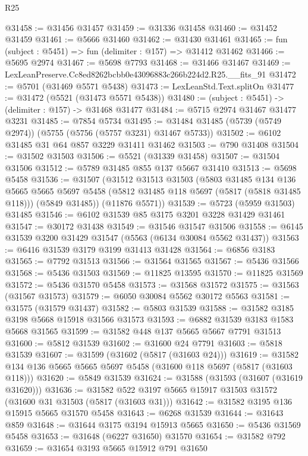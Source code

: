 \begin{lexlean}{R25}
\begin{coremodule}
@31458 := @31456 @31457
@31459 := @31336 @31458
@31460 := @31452 @31459
@31461 := @5666 @31460
@31462 := @31430 @31461
@31465 := fun (subject : @5451) => fun (delimiter : @157) => @31412 @31462
@31466 := @5695 @2974
@31467 := @5698 @7793
@31468 := @31466 @31467
@31469 := LexLeanPreserve.Cc8ed8262bcbb0e43096883c266b224d2.R25.__fits_91
@31472 := @5701 (@31469 @5571 @5438)
@31473 := LexLeanStd.Text.splitOn
@31477 := @31472 (@5521 (@31473 @5571 @5438))
@31480 := (subject : @5451) -> (delimiter : @157) -> @31468 @31477
@31484 := @5715 @2974 @31467 @31477 @3231
@31485 := @7854 @5734
@31495 := @31484 @31485 (@5739 (@5749 @2974)) (@5755 (@5756 (@5757 @3231) @31467 @5733))
@31502 := @6102 @31485 @31 @64 @857 @3229 @31411 @31462
@31503 := @790 @31408
@31504 := @31502 @31503
@31506 := @5521 (@31339 @31458)
@31507 := @31504 @31506
@31512 := @5789 @31485 @855 @137 @5667 @31410
@31513 := @5698 @5458
@31536 := @31507
    (@31512
      @31513
      @31503
      (@5803
        @31485
        @134
        @136
        @5665
        @5665
        @5697
        @5458
        (@5812 @31485 @118 @5697 (@5817 (@5818 @31485 @118)))
        (@5849 @31485))
      (@11876 @5571))
@31539 := @5723 (@5959 @31503) @31485
@31546 := @6102 @31539 @85 @3175 @3201 @3228 @31429 @31461
@31547 := @30172 @31438
@31549 := @31546 @31547 @31506
@31558 := @6145 @31539 @3200 @31429 @31547 (@5563 (@6134 @30084 @5562 @31437))
@31563 := @6416 @31539 @3179 @3199 @31413 @31428
@31564 := @6856 @3183
@31565 := @7792 @31513
@31566 := @31564 @31565
@31567 := @5436 @31566
@31568 := @5436 @31503
@31569 := @11825 @13595
@31570 := @11825 @31569
@31572 := @5436 @31570 @5458
@31573 := @31568 @31572
@31575 := @31563 (@31567 @31573)
@31579 := @6050 @30084 @5562 @30172 @5563
@31581 := @31575 (@31579 @31437)
@31582 := @5803 @31539
@31588 := @31582 @3185 @3198 @5668 @15918 @31566 @31573
@31593 := @6882 @31539 @3183 @1583 @5668 @31565
@31599 := @31582 @448 @137 @5665 @5667 @7791 @31513
@31600 := @5812 @31539
@31602 := @31600 @24 @7791
@31603 := @5818 @31539
@31607 := @31599 (@31602 (@5817 (@31603 @24)))
@31619 := @31582 @134 @136 @5665 @5665 @5697 @5458 (@31600 @118 @5697 (@5817 (@31603 @118)))
@31620 := @5849 @31539
@31624 := @31588 (@31593 (@31607 (@31619 @31620)))
@31636 := @31582 @522 @3197 @5665 @15917 @31503 @31572 (@31600 @31 @31503 (@5817 (@31603 @31)))
@31642 := @31582 @3195 @136 @15915 @5665 @31570 @5458
@31643 := @6268 @31539
@31644 := @31643 @859
@31648 := @31644 @3175 @3194 @15913 @5665
@31650 := @5436 @31569 @5458
@31653 := @31648 (@6227 @31650) @31570
@31654 := @31582 @792
@31659 := @31654 @3193 @5665 @15912 @791 @31650

\end{coremodule}
\end{lexlean}
